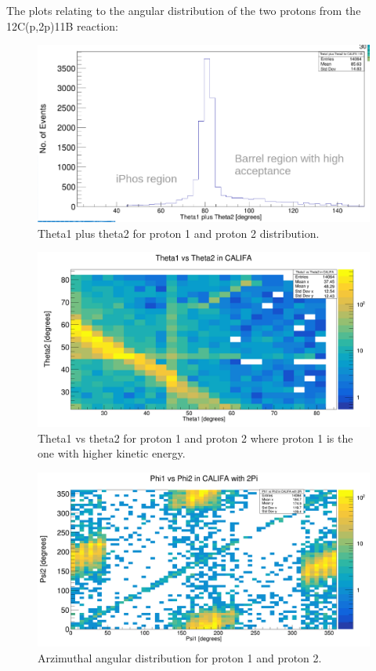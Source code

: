 \documentclass{report}
\begin{document}
The plots relating to the angular distribution of the two protons from the 12C(p,2p)11B reaction:\newline
\begin{figure}[!htb]
  \includegraphics[width=\linewidth]{theta1_plus_theta2.png}
  \caption{Theta1 plus theta2 for proton 1 and proton 2 distribution.}
\end{figure}
\begin{figure}[!htb]
  \includegraphics[width=\linewidth]{theta1_vs_theta2_right_binning.png}
  \caption{Theta1 vs theta2 for proton 1 and proton 2 where proton 1 is the one with higher kinetic energy.}
\end{figure}
\begin{figure}[!htb]
  \includegraphics[width=\linewidth]{psi1_vs_psi2.png}
  \caption{Arzimuthal angular distribution for proton 1 and proton 2.}
\end{figure}
\end{document}
